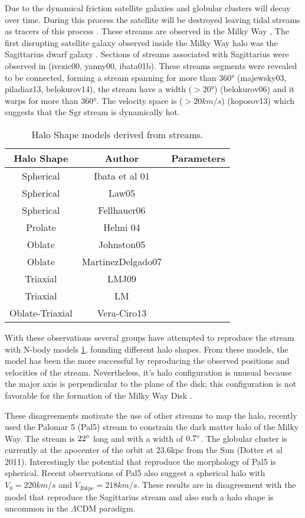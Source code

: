 Due to the dynamical friction satellite galaxies and globular clusters
will decay over time. During this process the satellite will be
destroyed leaving tidal streams as tracers of this process
\citep{Toomre72, LyndenBell95, Johnston96}. These streams are observed in the Milky Way
, The first disrupting satellite galaxy observed inside the Milky Way halo was the Sagittarius dwarf
galaxy \citep{Ibata94}. Sections of streams associated with Sagittarius were
observed in (ivezic00, yanny00, ibata01b).
These streams segments were revealed to be connected, forming a stream
spanning for more than $360°$ (majewsky03, piladiaz13, belokurov14), the stream have a width ($>20°$) (belokurov06) and it warps
for more than $360°$. The velocity space is ($>20km/s$) (koposov13)
which suggests that
the Sgr stream is dynamically hot.

\begin{table}
\begin{center}
\begin{tabular}{c c c}
\hline
\hline
Halo Shape & Author & Parameters \\
\hline
Spherical & Ibata et al 01 & \\
Spherical & Law05 & \\
Spherical & Fellhauer06 & \\
Prolate & Helmi 04 & \\
Oblate & Johnston05 & \\
Oblate & MartinezDelgado07 & \\
Triaxial & LMJ09 & \\
Triaxial & LM & \\
Oblate-Triaxial & Vera-Ciro13 & \\
\hline
\hline
\end{tabular}
\caption{Halo Shape models derived from streams.\label{tab:models}}
\end{center}
\end{table}


With these observations several groups have attempted to reproduce the
stream with N-body models \ref{tab:models}, founding different halo
shapes. From these models, the \citep{Law10} model has been
the more successful by reproducing the observed positions and velocities
of the stream. Nevertheless, it's halo configuration is unusual
because the major axis is perpendicular to the plane of the disk; this
configuration is not favorable for the formation of the
Milky Way Disk \citep{Debattista13}.

These disagreements motivate the use of other streams to map the halo,
recently \citep{Pearson15} used the Palomar 5 (Pal5) stream to constrain the dark
matter halo of the Milky Way. The stream is $22\degree$
long and with a width of $0.7 \degree$. The globular cluster is currently at the
apocenter of the orbit at 23.6kpc from the Sun (Dotter et al 2011). Interestingly
the potential that reproduce the morphology of Pal5 is spherical.
Recent observations of Pal5 \citep{Fritz15} also suggest a spherical
halo with $V_0 = 220 km/s$ and $V_{20kpc} = 218 km/s$. These results
are in disagreement with the \citep{Law10} model that reproduce the Sagittarius stream
and also such a halo shape is uncommon in the $\Lambda$CDM
paradigm. %

